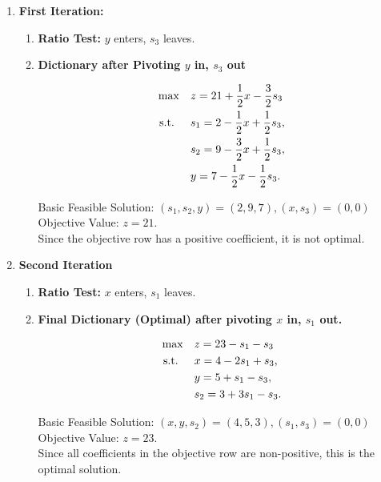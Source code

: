 \begin{enumerate}
    \item \textbf{First Iteration:}
\begin{enumerate}
    \item \textbf{Ratio Test:} \( y \) enters, \( s_3 \) leaves.

    \item \textbf{Dictionary after Pivoting \( y \) in, \( s_3 \) out}  
    \begin{tcolorbox}[colback=blue!5!white, colframe=blue!75!black,    
    width=0.6\textwidth, %
    box align=center, 
    title=\textbf{Second Dictionary}]
    \[
    \begin{aligned}
    \max \quad & z = 21 + \frac{1}{2}x - \frac{3}{2}s_3 \\
    \text{ s.t. } \quad 
    & s_1 = 2 - \frac{1}{2}x + \frac{1}{2}s_3, \\
    & s_2 = 9 - \frac{3}{2}x + \frac{1}{2}s_3, \\
    & y = 7 - \frac{1}{2}x - \frac{1}{2}s_3.
    \end{aligned}
    \]
    \end{tcolorbox}
    Basic Feasible Solution: \( (s_1, s_2, y) = (2,9,7), (x,s_3) = (0,0) \)  
    Objective Value: \( z = 21 \).\\ 
    Since the objective row has a positive coefficient, it is not optimal.  
    \end{enumerate}
    \item \textbf{Second Iteration}
    \begin{enumerate}
    \item \textbf{Ratio Test:} \( x \) enters, \( s_1 \) leaves.

    \item \textbf{Final Dictionary (Optimal) after pivoting $x$ in, $s_1$ out.} 
    \begin{tcolorbox}[colback=green!5!white, colframe=green!75!black,    
    width=0.6\textwidth, %
    box align=center, 
    title=\textbf{Final Dictionary}] 
    \[
    \begin{aligned}
    \max \quad & z = 23 - s_1 - s_3 \\
    \text{ s.t. } \quad
    & x = 4 - 2s_1 + s_3, \\
    & y = 5 + s_1 - s_3, \\
    & s_2 = 3 + 3s_1 - s_3.
    \end{aligned}
    \]
    \end{tcolorbox}
    Basic Feasible Solution: \( (x,y,s_2) = (4,5,3), (s_1,s_3) = (0,0) \)  
    Objective Value: \( z = 23 \).\\ 
    Since all coefficients in the objective row are non-positive, this is the optimal solution.
    \end{enumerate}
\end{enumerate}

